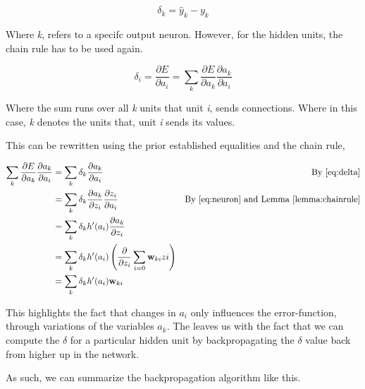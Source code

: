 \begin{equation}
\label{eq:output}
\delta_k = \hat{y}_k - y_k
\end{equation}

Where \textit{k}, refers to a specifc output neuron.
However, for the hidden units, the chain rule has to be used again.

\begin{equation}
\label{eq:bp}
\delta_i = \frac{\partial E}{\partial a_i} =
\sum_k \frac{\partial E}{\partial a_k} \frac{\partial a_k}{\partial a_i}
\end{equation}

Where the sum runs over all \textit{k} units that unit \textit{i}, sends
connections.
Where in this case, \textit{k} denotes the units that, unit \textit{i} sends
its values.

This can be rewritten using the prior established equalities and the chain rule,


\begin{align}
\sum_k \frac{\partial E}{\partial a_k} \frac{\partial a_k}{\partial a_i} &=
\sum_k \delta_k \frac{\partial a_k}{\partial a_i} & \text{By \eqref{eq:delta}}\\
&= \sum_k \delta_k \frac{\partial a_k}{\partial z_i} \frac{\partial z_i}{\partial a_i}
& \text{By \eqref{eq:neuron} and Lemma \ref{lemma:chainrule}} \\
&= \sum_k \delta_k h'(a_i) \frac{\partial a_k}{\partial z_i} \\
&= \sum_k \delta_k h'(a_i) \left( \frac{\partial}{\partial z_i}  \sum_{i=0} \mathbf{w}_{ki} z{i}\right) \\
&= \sum_k \delta_k h'(a_i) \mathbf{w}_{ki} \\
\end{align}

This highlights the fact that changes in $a_i$ only influences
the error-function, through variations of the variables $a_k$. The leaves us
with the fact that we can compute the $\delta$ for a particular hidden unit by
backpropagating the $\delta$ value back from higher up in the network.

As such, we can summarize the backpropagation algorithm like this.

